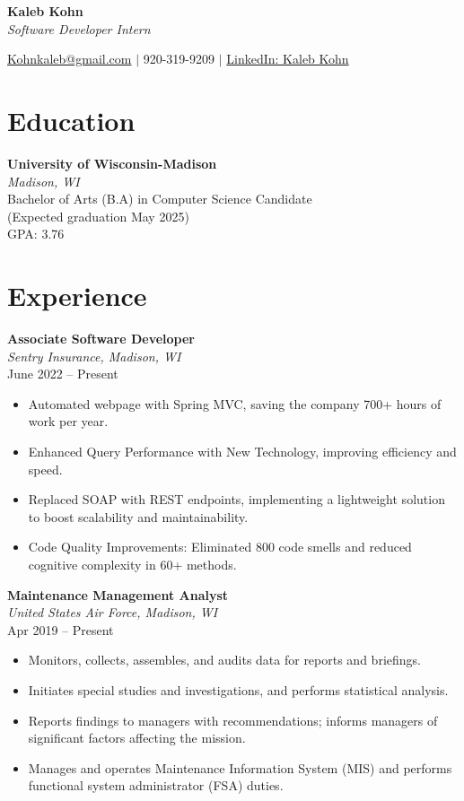 \documentclass[a4paper,10pt]{article}
\begin{document}
\begin{center}
    \textbf{\LARGE Kaleb Kohn} \\
    \textit{Software Developer Intern}
\end{center}

\begin{center}
    \href{mailto:Kohnkaleb@gmail.com}{Kohnkaleb@gmail.com} $\vert$ 920-319-9209 $\vert$ \href{https://www.linkedin.com/in/kalebkohn}{LinkedIn: Kaleb Kohn}
\end{center}

\section*{Education}
\textbf{University of Wisconsin-Madison} \\
\textit{Madison, WI} \\
Bachelor of Arts (B.A) in Computer Science Candidate \\
(Expected graduation May 2025) \\
GPA: 3.76

\section*{Experience}
\textbf{Associate Software Developer} \\
\textit{Sentry Insurance, Madison, WI} \\
June 2022 – Present
\begin{itemize}[leftmargin=*]
    \item Automated webpage with Spring MVC, saving the company 700+ hours of work per year.
    \item Enhanced Query Performance with New Technology, improving efficiency and speed.
    \item Replaced SOAP with REST endpoints, implementing a lightweight solution to boost scalability and maintainability.
    \item Code Quality Improvements: Eliminated 800 code smells and reduced cognitive complexity in 60+ methods.
\end{itemize}

\textbf{Maintenance Management Analyst} \\
\textit{United States Air Force, Madison, WI} \\
Apr 2019 – Present
\begin{itemize}[leftmargin=*]
    \item Monitors, collects, assembles, and audits data for reports and briefings.
    \item Initiates special studies and investigations, and performs statistical analysis.
    \item Reports findings to managers with recommendations; informs managers of significant factors affecting the mission.
    \item Manages and operates Maintenance Information System (MIS) and performs functional system administrator (FSA) duties.
\end{itemize}
\end{document}
